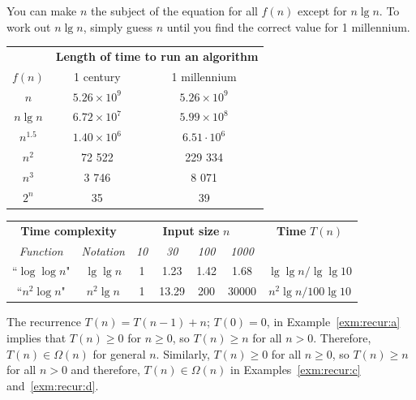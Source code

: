 {}%
You can make \(n\) the subject of the equation for all \(f(n)\) except for 
\(n\lg{n}\). 
To work out \(n\lg{n}\), simply guess \(n\) until you find the correct 
value for 1 millennium.

\begin{center}
\begin{tabular}{|c|c|c|}
\hline
& \multicolumn{2}{c|}{\textbf{Length of time to run an algorithm}} \\
\cline{2-3}
\(f(n)\)& 1 century & 1 millennium \\
\hline
\(n\)& $5.26 \times 10^9$ & \(5.26 \times 10^9 \)\\
\hline
\(n\lg{n}\)&$6.72 \times 10^7$ & \( 5.99 \times 10^8\) \\
\hline
\(n^{1.5}\)&$1.40 \times 10^6$ & \(6.51 \cdot 10^6\) \\
\hline
\(n^2\)& 72 522& 229 334\\
\hline
\(n^3\)& 3 746 & 8 071\\
\hline
\(2^n\)& 35 & 39\\
\hline
\end{tabular}
\end{center}

\begin{center}
\begin{tabular}{|c|c|cccc|c|}
\hline
\multicolumn{2}{|c|}{\textbf{Time complexity}} &\multicolumn{4}{|c|}{\textbf{Input size} \(n\)}& \textbf{Time} \(T(n)\) \\
\cline{1-6} 
\textit{Function}& \textit{Notation}& \textit{10}& \textit{30}& \textit{100}& \textit{1000}& \\
\hline
``\(\log{\log{n}}\)"& \(\lg{\lg{n}}\)& 1& 1.23& 1.42& 1.68& \(\lg{\lg{n}} / \lg{\lg{10}}\) \\
\hline 
``\(n^2\log{n}\)"&\(n^2\lg{n}\)& 1& 13.29& 200& 30000& \( n^2\lg{n} / 100\lg{10} \)\\
\hline
\end{tabular}
\end{center}

The recurrence $T(n) = T(n-1) + n$; $T(0)=0$, in Example~\ref{exm:recur:a} implies that 
$T(n) \geq 0$ for $n\geq 0$, so $T(n) \geq n$ 
for all $n > 0$. Therefore, \(T(n)\in\Omega(n)\) for general \(n\). Similarly,
$T(n) \geq 0 $ for all $n\geq 0$, so $T(n) \geq n$ for all $n > 0$ and 
therefore, $T(n)\in\Omega(n)$ in Examples~\ref{exm:recur:c} and~\ref{exm:recur:d}.

